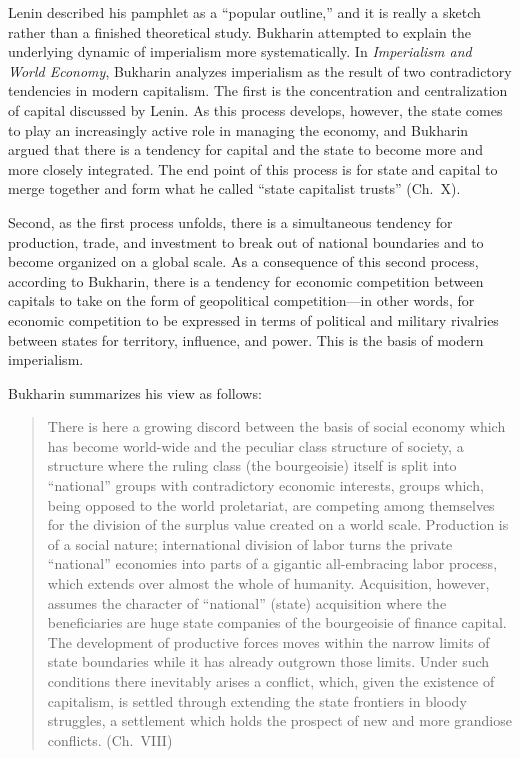 Lenin described his pamphlet as a ``popular outline,'' and it is really a sketch rather than a finished theoretical study. Bukharin attempted to explain the underlying dynamic of imperialism more systematically. In \emph{Imperialism and World Economy}, Bukharin analyzes imperialism as the result of two contradictory tendencies in modern capitalism. The first is the concentration and centralization of capital discussed by Lenin. As this process develops, however, the state comes to play an increasingly active role in managing the economy, and Bukharin argued that there is a tendency for capital and the state to become more and more closely integrated. The end point of this process is for state and capital to merge together and form what he called ``state capitalist trusts'' (Ch.\ X).

Second, as the first process unfolds, there is a simultaneous tendency for production, trade, and investment to break out of national boundaries and to become organized on a global scale. As a consequence of this second process, according to Bukharin, there is a tendency for economic competition between capitals to take on the form of geopolitical competition---in other words, for economic competition to be expressed in terms of political and military rivalries between states for territory, influence, and power. This is the basis of modern imperialism.

Bukharin summarizes his view as follows:

\blockquote{There is here a growing discord between the basis of social economy which has become world-wide and the peculiar class structure of society, a structure where the ruling class (the bourgeoisie) itself is split into ``national'' groups with contradictory economic interests, groups which, being opposed to the world proletariat, are competing among themselves for the division of the surplus value created on a world scale. Production is of a social nature; international division of labor turns the private ``national'' economies into parts of a gigantic all-embracing labor process, which extends over almost the whole of humanity. Acquisition, however, assumes the character of ``national'' (state) acquisition where the beneficiaries are huge state companies of the bourgeoisie of finance capital. The development of productive forces moves within the narrow limits of state boundaries while it has already outgrown those limits. Under such conditions there inevitably arises a conflict, which, given the existence of capitalism, is settled through extending the state frontiers in bloody struggles, a settlement which holds the prospect of new and more grandiose conflicts. (Ch.\ VIII)}

